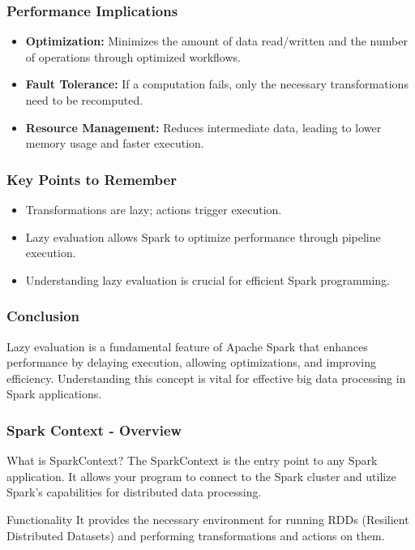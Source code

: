 \documentclass[aspectratio=169]{beamer}
\begin{document}
\begin{frame}
    \frametitle{Performance Implications}
    \begin{itemize}
        \item \textbf{Optimization:} 
        Minimizes the amount of data read/written and the number of operations through optimized workflows.
        
        \item \textbf{Fault Tolerance:} 
        If a computation fails, only the necessary transformations need to be recomputed.
        
        \item \textbf{Resource Management:} 
        Reduces intermediate data, leading to lower memory usage and faster execution.
    \end{itemize}
\end{frame}

\begin{frame}
    \frametitle{Key Points to Remember}
    \begin{itemize}
        \item Transformations are lazy; actions trigger execution.
        \item Lazy evaluation allows Spark to optimize performance through pipeline execution.
        \item Understanding lazy evaluation is crucial for efficient Spark programming.
    \end{itemize}
\end{frame}

\begin{frame}
    \frametitle{Conclusion}
    Lazy evaluation is a fundamental feature of Apache Spark that enhances performance by delaying execution, allowing optimizations, and improving efficiency. Understanding this concept is vital for effective big data processing in Spark applications.
\end{frame}

\begin{frame}[fragile]
    \frametitle{Spark Context - Overview}
    
    \begin{block}{What is SparkContext?}
        The SparkContext is the entry point to any Spark application. 
        It allows your program to connect to the Spark cluster and utilize Spark's capabilities for distributed data processing.
    \end{block}
    
    \begin{block}{Functionality}
        It provides the necessary environment for running RDDs (Resilient Distributed Datasets) and performing transformations and actions on them.
    \end{block}
\end{frame}
\end{document}
